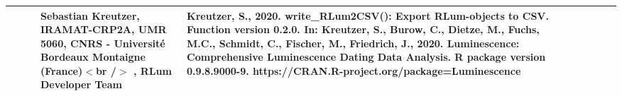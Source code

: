 \begin{table}[ht]
\begin{tabular}{rllllllll}
 &  &  & Sebastian Kreutzer, IRAMAT-CRP2A, UMR 5060, CNRS - Université Bordeaux Montaigne (France)$<$br /$>$ , RLum Developer Team & Kreutzer, S., 2020. write\_RLum2CSV(): Export RLum-objects to CSV. Function version 0.2.0. In: Kreutzer, S., Burow, C., Dietze, M., Fuchs, M.C., Schmidt, C., Fischer, M., Friedrich, J., 2020. Luminescence: Comprehensive Luminescence Dating Data Analysis. R package version 0.9.8.9000-9. https://CRAN.R-project.org/package=Luminescence
 \\ 
   \hline
\end{tabular}
\end{table}


